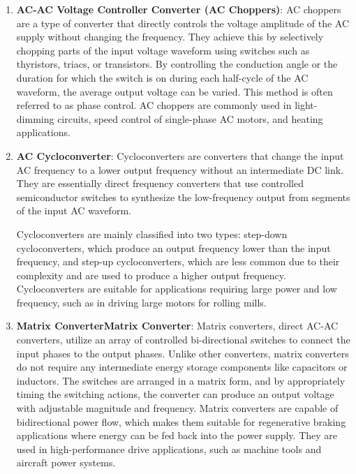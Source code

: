 \begin{enumerate}
    \item \textbf{AC-AC Voltage Controller Converter (AC Choppers)}: AC choppers are a type of converter that directly controls the voltage amplitude of the AC supply without changing the frequency. They achieve this by selectively chopping parts of the input voltage waveform using switches such as thyristors, triacs, or transistors. By controlling the conduction angle or the duration for which the switch is on during each half-cycle of the AC waveform, the average output voltage can be varied. This method is often referred to as phase control. AC choppers are commonly used in light-dimming circuits, speed control of single-phase AC motors, and heating applications. 
    
    \item \textbf{AC Cycloconverter}: Cycloconverters are converters that change the input AC frequency to a lower output frequency without an intermediate DC link. They are essentially direct frequency converters that use controlled semiconductor switches to synthesize the low-frequency output from segments of the input AC waveform. 

    Cycloconverters are mainly classified into two types: step-down cycloconverters, which produce an output frequency lower than the input frequency, and step-up cycloconverters, which are less common due to their complexity and are used to produce a higher output frequency. Cycloconverters are suitable for applications requiring large power and low frequency, such as in driving large motors for rolling mills.

    \item \textbf{Matrix ConverterMatrix Converter}: Matrix converters, direct AC-AC converters, utilize an array of controlled bi-directional switches to connect the input phases to the output phases. Unlike other converters, matrix converters do not require any intermediate energy storage components like capacitors or inductors. The switches are arranged in a matrix form, and by appropriately timing the switching actions, the converter can produce an output voltage with adjustable magnitude and frequency. Matrix converters are capable of bidirectional power flow, which makes them suitable for regenerative braking applications where energy can be fed back into the power supply. They are used in high-performance drive applications, such as machine tools and aircraft power systems. 
    
\end{enumerate}

